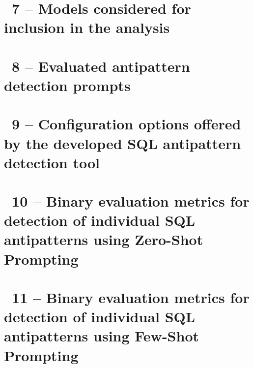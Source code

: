 \clearpage
{}
\makeatletter
\def\@currentlabel{7}
\makeatother
{}\label{chapter:appendix-model-selection}
\chapter*{\appendixTitle~7 -- Models considered for inclusion in the analysis}


\clearpage
{}
\makeatletter
\def\@currentlabel{8}
\makeatother
{}\label{chapter:appendix-final-prompts}
\chapter*{\appendixTitle~8 -- Evaluated antipattern detection prompts}


\clearpage
{}
\makeatletter
\def\@currentlabel{9}
\makeatother
{}\label{chapter:appendix-configuration-options}
\chapter*{\appendixTitle~9 -- Configuration options offered by the developed SQL antipattern detection tool}


\clearpage
{}
\makeatletter
\def\@currentlabel{10}
\makeatother
{}\label{chapter:appendix-zero-shot-accuracy}
\chapter*{\appendixTitle~10 -- Binary evaluation metrics for detection of individual SQL antipatterns using Zero-Shot Prompting}


\clearpage
{}
\makeatletter
\def\@currentlabel{11}
\makeatother
{}\label{chapter:appendix-few-shot-accuracy}
\chapter*{\appendixTitle~11 -- Binary evaluation metrics for detection of individual SQL antipatterns using Few-Shot Prompting}


